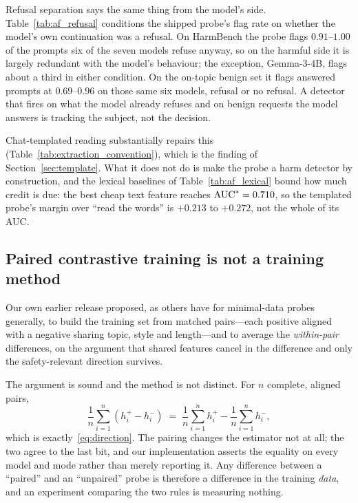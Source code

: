 Refusal separation says the same thing from the model's side. Table~\ref{tab:af_refusal} conditions the shipped
probe's flag rate on whether the model's own continuation was a refusal. On HarmBench the probe flags $0.91$--$1.00$ of
the prompts six of the seven models refuse anyway, so on the harmful side it is largely redundant with the model's
behaviour; the exception, Gemma-3-4B, flags about a third in either condition. On the on-topic benign set it flags
answered prompts at $0.69$--$0.96$ on those same six models, refusal or no refusal. A detector that fires on what the
model already refuses and on benign requests the model answers is tracking the subject, not the decision.



Chat-templated reading substantially repairs this (Table~\ref{tab:extraction_convention}), which is the finding of
Section~\ref{sec:template}. What it does not do is make the probe a harm detector by construction, and the lexical
baselines of Table~\ref{tab:af_lexical} bound how much credit is due: the best cheap text feature reaches
$\text{AUC}^{*}{} = 0.710$, so the templated probe's margin over ``read the words'' is $+0.213$ to $+0.272$, not the whole
of its AUC.

\subsection{Paired contrastive training is not a training method}
\label{sec:paired}

Our own earlier release \cite{messenger2026aase} proposed, as others have for minimal-data probes generally, to build
the training set from matched pairs---each positive aligned with a negative sharing topic, style and length---and to
average the \emph{within-pair} differences, on the argument
that shared features cancel in the difference and only the safety-relevant direction survives.

The argument is sound and the method is not distinct. For $n$ complete, aligned pairs,
\begin{equation}
    \frac{1}{n}\sum_{i=1}^{n}\left(h^{+}_{i} - h^{-}_{i}\right)
    \;=\; \frac{1}{n}\sum_{i=1}^{n} h^{+}_{i} - \frac{1}{n}\sum_{i=1}^{n} h^{-}_{i},
    \label{eq:identity}
\end{equation}
which is exactly~\eqref{eq:direction}. The pairing changes the estimator not at all; the two agree to the last bit,
and our implementation asserts the equality on every model and mode rather than merely reporting it. Any difference
between a ``paired'' and an ``unpaired'' probe is therefore a difference in the training \emph{data}, and an
experiment comparing the two rules is measuring nothing.

